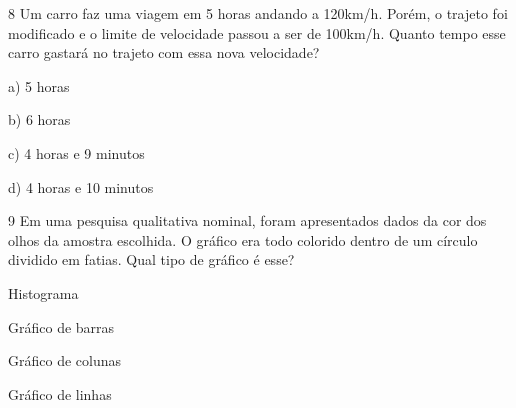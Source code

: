 
\num{8} Um carro faz uma viagem em 5 horas andando a 120km/h. Porém, o
trajeto foi modificado e o limite de velocidade passou a ser de 100km/h.
Quanto tempo esse carro gastará no trajeto com essa nova velocidade?

a) 5 horas

b) 6 horas

c) 4 horas e 9 minutos

d) 4 horas e 10 minutos




\num{9} Em uma pesquisa qualitativa nominal, foram apresentados dados da cor
dos olhos da amostra escolhida. O gráfico era todo colorido dentro de um
círculo dividido em fatias. Qual tipo de gráfico é esse?

\item
  Histograma
\item
  Gráfico de barras
\item
  Gráfico de colunas
\item
  Gráfico de linhas

